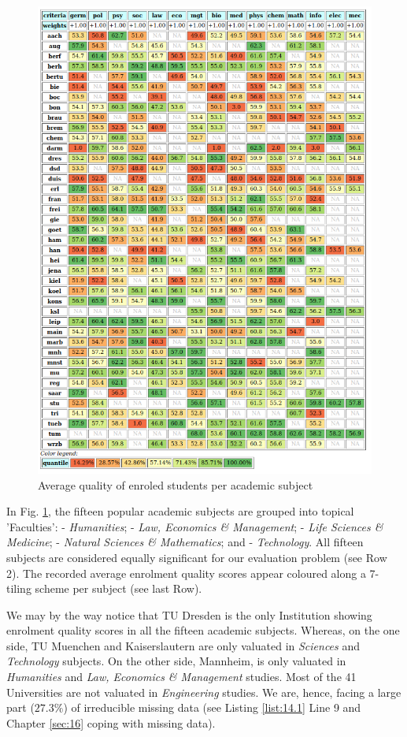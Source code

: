 \begin{figure}[h]
\includegraphics[width=12cm]{Figures/ratingData.png}
\caption{Average quality of enroled students per academic subject}
\label{fig:14.1}       %
\end{figure}
\clearpage
In Fig. \ref{fig:14.1}, the fifteen popular academic subjects are grouped into topical 'Faculties': - \emph{Humanities}; - \emph{Law, Economics \& Management}; - \emph{Life Sciences \& Medicine}; - \emph{Natural Sciences \& Mathematics}; and - \emph{Technology}. All fifteen subjects are considered equally significant for our evaluation problem (see Row 2). The recorded average enrolment quality scores appear coloured along a 7-tiling scheme per subject (see last Row).

We may by the way notice that TU Dresden is the only Institution showing enrolment quality scores in all the fifteen academic subjects. Whereas, on the one side, TU Muenchen and Kaiserslautern are only valuated in \emph{Sciences} and \emph{Technology} subjects. On the other side, Mannheim, is only valuated in \emph{Humanities} and \emph{Law, Economics \& Management} studies. Most of the 41 Universities are not valuated in \emph{Engineering} studies. We are, hence, facing a large part ($27.3\%$) of irreducible missing data (see Listing \ref{list:14.1} Line 9 and Chapter \ref{sec:16} coping with missing data).

